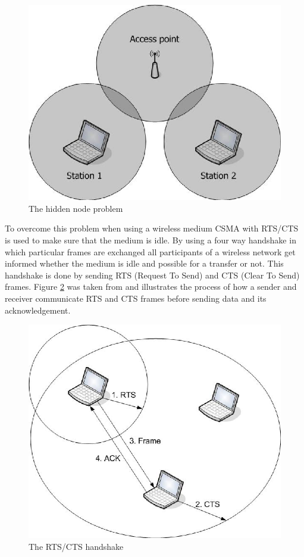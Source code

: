 \begin{figure}[htbp]
	\vspace{1.5em}
	\begin{center}
		\includegraphics[width=0.5\columnwidth]{graphics/HiddenNode}
	\end{center}
	\caption{The hidden node problem}
	\vspace{1.5em}
	\label{hiddennode}
\end{figure}

To overcome this problem when using a wireless medium CSMA with RTS/CTS is used to make sure that the medium is idle. By using a four way handshake in which particular frames are exchanged all participants of a wireless network get informed whether the medium is idle and possible for a transfer or not. This handshake is done by sending RTS (Request To Send) and CTS (Clear To Send) frames. Figure \ref{rtscts} was taken from \cite[p.36]{80211wireless} and illustrates the process of how a sender and receiver communicate RTS and CTS frames before sending data and its acknowledgement.

\begin{figure}
	\begin{center}
		\includegraphics[width=0.65\columnwidth]{graphics/RtsCtsHandshake}
	\end{center}
	\vspace{-1em}
	\caption{The RTS/CTS handshake}
	\vspace{1.5em}
	\label{rtscts}
\end{figure}

